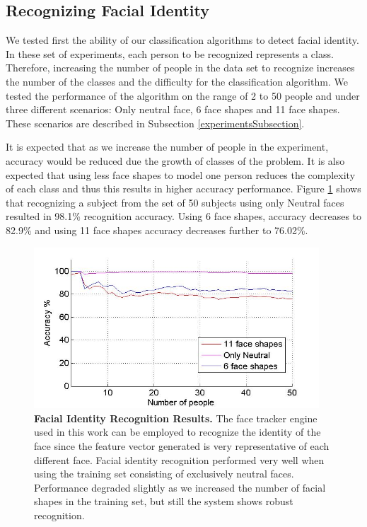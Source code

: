 \documentclass[]{article}
\begin{document}
\subsection{Recognizing Facial Identity}
We tested first the ability of our classification algorithms to detect facial identity. In these set of experiments,
each person to be recognized represents a class. Therefore, increasing the number of people in the data set to recognize
increases the number of the classes and the difficulty for the classification algorithm. We tested the performance of
the algorithm on the range of 2 to 50 people and under three different scenarios: Only neutral face, 6 face
shapes and 11 face shapes. These scenarios are described in Subsection \ref{experimentsSubsection}.


It is expected that as we increase the number of people in the experiment, accuracy would be reduced due the growth of
classes of the problem. It is also expected  that using less face shapes to model one person reduces the complexity of
each class and thus this results in higher accuracy performance. Figure \ref{identityRecognition} shows that recognizing a subject from the set of 50
subjects using only Neutral faces resulted in 98.1\% recognition accuracy.  Using 6 face shapes, accuracy decreases to
82.9\% and using 11 face shapes accuracy decreases further to 76.02\%.


\begin{figure}[ht]
\begin{center}
\vspace{-3mm}
\includegraphics[width=0.95\textwidth]{figures/peopleRecognition4.jpg}
\end{center}
\caption{\textbf{Facial Identity Recognition Results.} The face tracker engine used in this work can be employed 
to recognize the identity of the face since the feature vector generated is very representative  of each different face.
Facial identity recognition performed very well when using the training set consisting of exclusively neutral faces. 
Performance degraded slightly as we increased the number of facial shapes in the training set, but still the system shows 
robust  recognition.}
\label{identityRecognition}
\end{figure}
\end{document}

